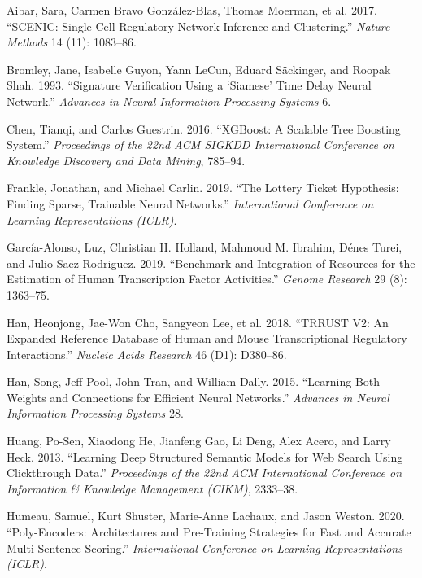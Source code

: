\documentclass[
  12pt,
]{report}
\newlength{\cslhangindent}
\newenvironment{CSLReferences}[2] %
 {\begin{list}{}{%
  \setlength{\itemindent}{0pt}
  \setlength{\leftmargin}{0pt}
  \setlength{\parsep}{0pt}
  \ifodd #1
   \setlength{\leftmargin}{\cslhangindent}
   \setlength{\itemindent}{-1\cslhangindent}
  \fi
  \setlength{\itemsep}{#2\baselineskip}}}
 {\end{list}}
\begin{document}
\protect{}\label{refs}
\begin{CSLReferences}{1}{1}
{Aibar, Sara, Carmen Bravo González-Blas, Thomas Moerman, et al.} 2017.
{``{SCENIC}: Single-Cell Regulatory Network Inference and Clustering.''}
\emph{Nature Methods} 14 (11): 1083--86.

Bromley, Jane, Isabelle Guyon, Yann LeCun, Eduard Säckinger, and Roopak
Shah. 1993. {``Signature Verification Using a {`{Siamese}'} Time Delay
Neural Network.''} \emph{Advances in Neural Information Processing
Systems} 6.

Chen, Tianqi, and Carlos Guestrin. 2016. {``{XGBoost}: {A} Scalable Tree
Boosting System.''} \emph{Proceedings of the 22nd ACM SIGKDD
International Conference on Knowledge Discovery and Data Mining},
785--94.

Frankle, Jonathan, and Michael Carlin. 2019. {``The Lottery Ticket
Hypothesis: {Finding} Sparse, Trainable Neural Networks.''}
\emph{International Conference on Learning Representations (ICLR)}.

García-Alonso, Luz, Christian H. Holland, Mahmoud M. Ibrahim, Dénes
Turei, and Julio Saez-Rodriguez. 2019. {``Benchmark and Integration of
Resources for the Estimation of Human Transcription Factor
Activities.''} \emph{Genome Research} 29 (8): 1363--75.

{Han, Heonjong, Jae-Won Cho, Sangyeon Lee, et al.} 2018. {``{TRRUST} V2:
An Expanded Reference Database of Human and Mouse Transcriptional
Regulatory Interactions.''} \emph{Nucleic Acids Research} 46 (D1):
D380--86.

Han, Song, Jeff Pool, John Tran, and William Dally. 2015. {``Learning
Both Weights and Connections for Efficient Neural Networks.''}
\emph{Advances in Neural Information Processing Systems} 28.

Huang, Po-Sen, Xiaodong He, Jianfeng Gao, Li Deng, Alex Acero, and Larry
Heck. 2013. {``Learning Deep Structured Semantic Models for Web Search
Using Clickthrough Data.''} \emph{Proceedings of the 22nd ACM
International Conference on Information \& Knowledge Management (CIKM)},
2333--38.

Humeau, Samuel, Kurt Shuster, Marie-Anne Lachaux, and Jason Weston.
2020. {``Poly-Encoders: Architectures and Pre-Training Strategies for
Fast and Accurate Multi-Sentence Scoring.''} \emph{International
Conference on Learning Representations (ICLR)}.


\end{CSLReferences}
\end{document}
